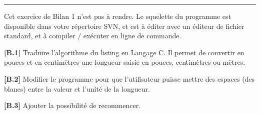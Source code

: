 \documentclass[11pt]{article}
\begin{document}
\begin{center}\rule{0.5\linewidth}{0.5pt}\end{center}

Cet exercice de Bilan 1 n'est pas à rendre. Le squelette du programme
est disponible dans votre répertoire SVN, et est à éditer avec un
éditeur de fichier standard, et à compiler / exécuter en ligne de
commande.

\textbf{{[}B.1{]}} Traduire l'algorithme du listing en Langage C. Il
permet de convertir en pouces et en centimètres une longueur saisie en
pouces, centimètres ou mètres.

\textbf{{[}B.2{]}} Modifier le programme pour que l'utilisateur puisse
mettre des espaces (des blancs) entre la valeur et l'unité de la
longueur.

\textbf{{[}B.3{]}} Ajouter la possibilité de recommencer.
\end{document}
